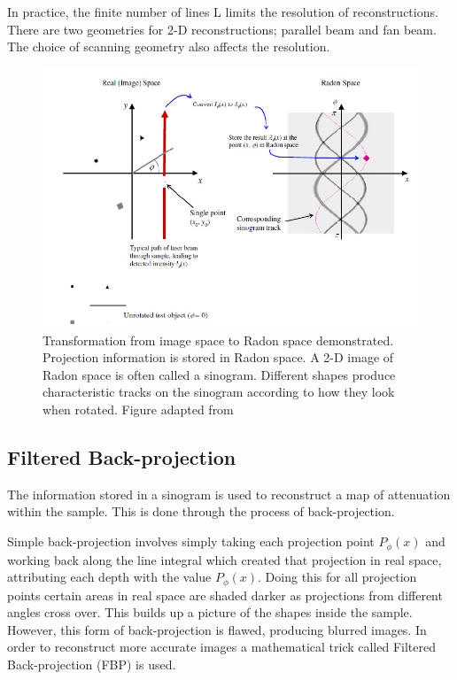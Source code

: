 \documentclass[12pt]{article}
\begin{document}
In practice, the finite number of lines L limits the resolution of reconstructions. There are two geometries for 2-D reconstructions; parallel beam and fan beam. The choice of scanning geometry also affects the resolution. \cite{natterer2001mathematics}

\begin{figure}[H]
\centering
\includegraphics[width=\textwidth]{Doran_2008_sinogram.jpg}
\caption{Transformation from image space to Radon space demonstrated. Projection information is stored in Radon space. A 2-D image of Radon space is often called a sinogram. Different shapes produce characteristic tracks on the sinogram according to how they look when rotated. Figure adapted from \cite{Doran:2008kh}}
\label{fig:sinogram}
\end{figure}









\subsection{Filtered Back-projection}
\label{subsec:FBP}

The information stored in a sinogram is used to reconstruct a map of attenuation within the sample. This is done through the process of back-projection.

Simple back-projection involves simply taking each projection point $P_{\phi}(x)$ and working back along the line integral which created that projection in real space,  attributing each depth with the value $P_{\phi}(x)$. Doing this for all projection points certain areas in real space are shaded darker as projections from different angles cross over. This builds up a picture of the shapes inside the sample. However, this form of back-projection is flawed, producing blurred images. In order to reconstruct more accurate images a mathematical trick called Filtered Back-projection (FBP) is used.
\end{document}
